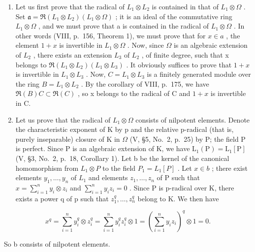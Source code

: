 \begin{enumerate}
\def\labelenumi{\Alph{enumi})}
\item
  Let us first prove that the radical of \(L_{1} \otimes L_{2}\) is contained in that of \(L_{1} \otimes \Omega\) . Set \(\mathfrak{a} = \Re(L_{1} \otimes L_{2})(L_{1} \otimes \Omega)\) ; it is an ideal of the commutative ring \(L_{1} \otimes \Omega\) , and we must prove that a is contained in the radical of \(L_{1} \otimes \Omega\) . In other words (VIII, p.~156, Theorem 1), we must prove that for \(x \in a\) , the element \(1 + x\) is invertible in \(L_{1} \otimes \Omega\) . Now, since \(\Omega\) is an algebraic extension of \(L_{2}\) , there exists an extension \(L_{3}\) of \(L_{2}\) , of finite degree, such that x belongs to \(\Re(L_{1} \otimes L_{2})(L_{1} \otimes L_{3})\) . It obviously suffices to prove that \(1 + x\) is invertible in \(L_{1} \otimes L_{3}\) . Now, \(C = L_{1} \otimes L_{3}\) is a finitely generated module over the ring \(B = L_{1} \otimes L_{2}\) . By the corollary of VIII, p.~175, we have \(\Re(B)C \subset \Re(C)\) , so x belongs to the radical of C and \(1 + x\) is invertible in C.
\item
  Let us prove that the radical of \(L_{1} \otimes \Omega\) consists of nilpotent elements. Denote the characteristic exponent of K by p and the relative p-radical (that is, purely inseparable) closure of K in \(\Omega\) (V, §5, No.~2, p.~25) by P; the field P is perfect. Since P is an algebraic extension of K, we have \(\mathrm{L}_{1}(\mathrm{P}) = \mathrm{L}_{1}[\mathrm{P}]\) (V, §3, No.~2, p.~18, Corollary 1). Let b be the kernel of the canonical homomorphism from \(L_{1} \otimes P\) to the field \(P_{1} = L_{1}[P]\) . Let \(x \in b\) ; there exist elements \(y_{1}, \ldots, y_{n}\) of \(L_{1}\) and elements \(z_{1}, \ldots, z_{n}\) of P such that \(x = \sum_{i=1}^{n} y_{i} \otimes z_{i}\) and \(\sum_{i=1}^{n} y_{i} z_{i} = 0\) . Since P is p-radical over K, there exists a power q of p such that \(z_{1}^{q}, \ldots, z_{n}^{q}\) belong to K. We then have
\end{enumerate}

\[
x ^ {q} = \sum_ {i = 1} ^ {n} y _ {i} ^ {q} \otimes z _ {i} ^ {q} = \sum_ {i = 1} ^ {n} y _ {i} ^ {q} z _ {i} ^ {q} \otimes 1 = \left(\sum_ {i = 1} ^ {n} y _ {i} z _ {i}\right) ^ {q} \otimes 1 = 0.
\]

So b consists of nilpotent elements.

